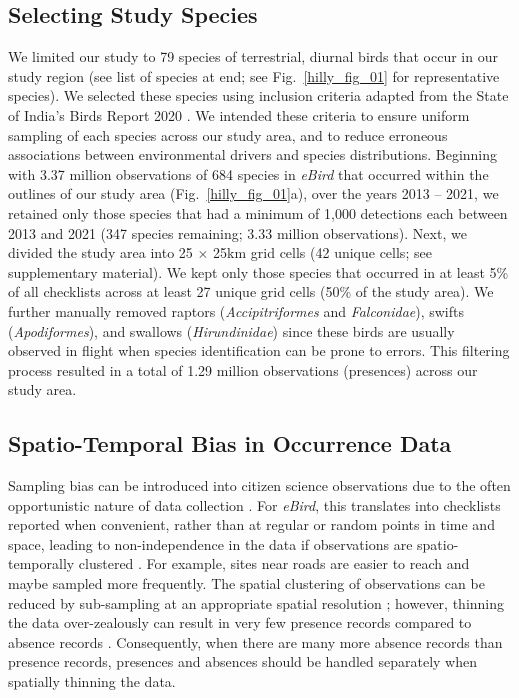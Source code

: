 \subsection*{Selecting Study Species}

We limited our study to 79 species of terrestrial, diurnal birds that occur in our study region (see list of species at end; see Fig.~\ref{hilly_fig_01} for representative species).
We selected these species using inclusion criteria adapted from the State of India's Birds Report 2020 \citep[SoIB][]{viswanathan2020}.
We intended these criteria to ensure uniform sampling of each species across our study area, and to reduce erroneous associations between environmental drivers and species distributions.
Beginning with 3.37 million observations of 684 species in \textit{eBird} that occurred within the outlines of our study area (Fig.~\ref{hilly_fig_01}a), over the years 2013 -- 2021, we retained only those species that had a minimum of 1,000 detections each between 2013 and 2021 (347 species remaining; 3.33 million observations).
Next, we divided the study area into 25 $\times$ 25km grid cells (42 unique cells; see supplementary material).
We kept only those species that occurred in at least 5\% of all checklists across at least 27 unique grid cells (50\% of the study area).
We further manually removed raptors (\textit{Accipitriformes} and \textit{Falconidae}), swifts (\textit{Apodiformes}), and swallows (\textit{Hirundinidae}) since these birds are usually observed in flight when species identification can be prone to errors.
This filtering process resulted in a total of 1.29 million observations (presences) across our study area.

\subsection*{Spatio-Temporal Bias in Occurrence Data}

Sampling bias can be introduced into citizen science observations due to the often opportunistic nature of data collection \citep{sullivan2014}.
For \textit{eBird}, this translates into checklists reported when convenient, rather than at regular or random points in time and space, leading to non-independence in the data if observations are spatio-temporally clustered \citep{johnston2021}.
For example, sites near roads are easier to reach and maybe sampled more frequently.
The spatial clustering of observations can be reduced by sub-sampling at an appropriate spatial resolution \citep{aiello-lammens2015}; however, thinning the data over-zealously can result in very few presence records compared to absence records \citep[i.e., class imbalance][]{steen2019}.
Consequently, when there are many more absence records than presence records, presences and absences should be handled separately when spatially thinning the data.

